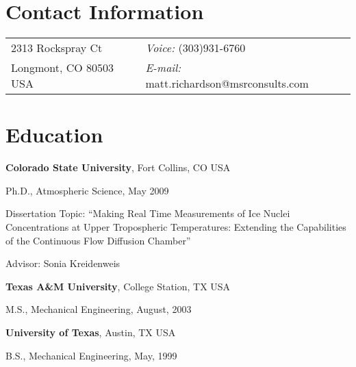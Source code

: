 \documentclass[margin,line]{res}
\newenvironment{list1}{
  \begin{list}{\ding{113}}{%
      \setlength{\itemsep}{0in}
      \setlength{\parsep}{0in} \setlength{\parskip}{0in}
      \setlength{\topsep}{0in} \setlength{\partopsep}{0in} 
      \setlength{\leftmargin}{0.17in}}}{\end{list}}
\begin{document}

\begin{resume}
\section{\sc Contact Information}
\vspace{.05in}
\begin{tabular}{@{}p{2in}p{4in}}
2313 Rockspray Ct             & {\it Voice:}  (303)931-6760 \\            
Longmont, CO 80503 USA  & {\it E-mail:}    matt.richardson@msrconsults.com \\      
\end{tabular}

\section{\sc Education}
{\bf Colorado State University}, Fort Collins, CO USA\\
\vspace*{-.1in}
\begin{list1}
\item[] Ph.D., Atmospheric Science, May 2009
\vspace*{.05in}
\item[] Dissertation Topic:  ``Making Real Time Measurements of Ice Nuclei Concentrations at Upper Tropospheric Temperatures: Extending the Capabilities of the Continuous Flow Diffusion Chamber'' 
\item[] Advisor:  Sonia Kreidenweis
\end{list1}

{\bf Texas A\&M University}, College Station, TX USA\\
\vspace*{-.1in}
\begin{list1}
\item[] M.S., Mechanical Engineering,  August, 2003
\end{list1}

{\bf University of Texas}, Austin, TX USA\\
\vspace*{-.1in}
\begin{list1}
\item[] B.S., Mechanical Engineering,  May, 1999
\end{list1}


\end{resume}
\end{document}
